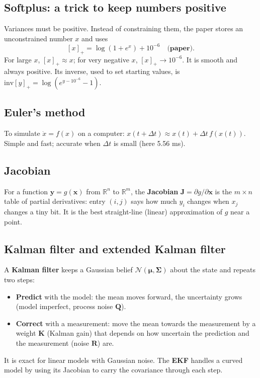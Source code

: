 \documentclass[11pt,a4paper]{article}
\newcommand{\mmu}{\boldsymbol{\mu}}
\newcommand{\SSigma}{\boldsymbol{\Sigma}}
\newcommand{\splus}[1]{[#1]_+}
\begin{document}
\subsection{Softplus: a trick to keep numbers positive}
Variances must be positive. Instead of constraining them, the paper stores an unconstrained number $x$ and uses
\[
\splus{x}=\log(1+e^x)+10^{-6}\quad\textbf{(paper)} .
\]
For large $x$, $\splus{x}\approx x$; for very negative $x$, $\splus{x}\to10^{-6}$. It is smooth and always positive. Its inverse, used to set starting values, is $\mathrm{inv}\splus{y}=\log(e^{y-10^{-6}}-1)$.

\subsection{Euler's method}
To simulate $\dot x=f(x)$ on a computer: $x(t+\Delta t)\approx x(t)+\Delta t\,f(x(t))$. Simple and fast; accurate when $\Delta t$ is small (here 5.56 ms).

\subsection{Jacobian}
For a function $\mathbf y=g(\mathbf x)$ from $\mathbb R^n$ to $\mathbb R^m$, the \textbf{Jacobian} $\mathbf J=\partial g/\partial\mathbf x$ is the $m\times n$ table of partial derivatives: entry $(i,j)$ says how much $y_i$ changes when $x_j$ changes a tiny bit.
It is the best straight-line (linear) approximation of $g$ near a point.

\subsection{Kalman filter and extended Kalman filter}
A \textbf{Kalman filter} keeps a Gaussian belief $\mathcal N(\mmu,\SSigma)$ about the state and repeats two steps:
\begin{itemize}
\item \textbf{Predict} with the model: the mean moves forward, the uncertainty grows (model imperfect, process noise $\mathbf Q$).
\item \textbf{Correct} with a measurement: move the mean towards the measurement by a weight $\mathbf K$ (Kalman gain) that depends on how uncertain the prediction and the measurement (noise $\mathbf R$) are.
\end{itemize}
It is exact for linear models with Gaussian noise. The \textbf{EKF} handles a curved model by using its Jacobian to carry the covariance through each step.
\end{document}
